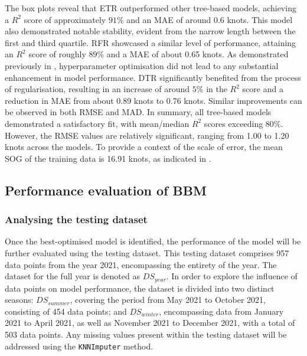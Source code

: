 The box plots reveal that ETR outperformed other tree-based models, achieving a $R^2$ score of approximately $91\%$ and an MAE of around 0.6 knots. This model also demonstrated notable stability, evident from the narrow length between the first and third quartile. RFR showcased a similar level of performance, attaining an $R^2$ score of roughly $89\%$ and a MAE of about 0.65 knots. As demonstrated previously in , hyperparameter optimisation did not lead to any substantial enhancement in model performance. DTR significantly benefited from the process of regularisation, resulting in an increase of around $5\%$ in the $R^2$ score and a reduction in MAE from about 0.89 knots to 0.76 knots. Similar improvements can be observed in both RMSE and MAD. In summary, all tree-based models demonstrated a satisfactory fit, with mean/median $R^2$ scores exceeding $80\%$. However, the RMSE values are relatively significant, ranging from 1.00 to 1.20 knots across the models. To provide a context of the scale of error, the mean SOG of the training data is 16.91 knots, as indicated in .\\

\subsection{Performance evaluation of BBM}\label{sec:Perf_eval_BBM}

\subsubsection{Analysing the testing dataset}\label{sec:testing_data_analysis}

Once the best-optimised model is identified, the performance of the model will be further evaluated using the testing dataset. This testing dataset comprises 957 data points from the year 2021, encompassing the entirety of the year. The dataset for the full year is denoted as $DS_{year}$. In order to explore the influence of data points on model performance, the dataset is divided into two distinct seasons: $DS_{summer}$, covering the period from May 2021 to October 2021, consisting of 454 data points; and $DS_{winter}$, encompassing data from January 2021 to April 2021, as well as November 2021 to December 2021, with a total of 503 data points. Any missing values present within the testing dataset will be addressed using the {\tt KNNImputer} method.\\

